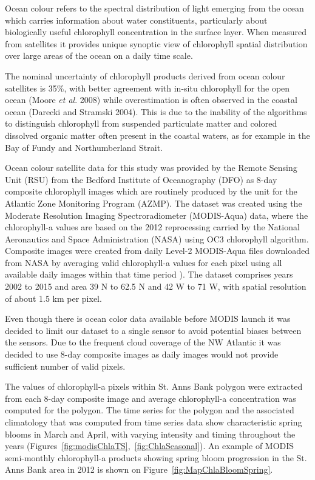 \documentclass[letterpaper,portrait,11pt]{scrartcl}
\numberwithin{equation}{section}		%
\numberwithin{figure}{section}		%
\numberwithin{table}{section}				%
\begin{document}
Ocean colour refers to the spectral distribution of light emerging from the ocean which carries information about water constituents, particularly about biologically useful chlorophyll concentration in the surface layer. When measured from satellites it provides unique synoptic view of chlorophyll spatial distribution over large areas of the ocean on a daily time scale.

The nominal uncertainty of chlorophyll products derived from ocean colour satellites is 35\%, with better agreement with in-situ chlorophyll for the open ocean (Moore \textit{et al}. 2008) while overestimation is often observed in the coastal ocean (Darecki and Stramski 2004). This is due to the inability of the algorithms to distinguish chlorophyll from suspended particulate matter and colored dissolved organic matter often present in the coastal waters, as for example in the Bay of Fundy and Northumberland Strait.

Ocean colour satellite data for this study was provided by the Remote Sensing Unit (RSU) from the Bedford Institute of Oceanography (DFO) as 8-day composite chlorophyll images which are routinely produced by the unit for the Atlantic Zone Monitoring Program (AZMP). The dataset was created using the Moderate Resolution Imaging Spectroradiometer (MODIS-Aqua) data, where the chlorophyll-a values are based on the 2012 reprocessing carried by the National Aeronautics and Space Administration (NASA) using OC3 chlorophyll algorithm. Composite images were created from daily Level-2 MODIS-Aqua files downloaded from NASA by averaging valid chlorophyll-a values for each pixel using all available daily images within that time period \parencite{Caverhill:2015:modis,feldman:2015}). The dataset comprises years 2002 to 2015 and area 39 N to 62.5 N and 42 W to 71 W, with spatial resolution of about 1.5 km per pixel. 

Even though there is ocean color data available before MODIS launch it was decided to limit our dataset to a single sensor to avoid potential biases between the sensors. Due to the frequent cloud coverage of the NW Atlantic it was decided to use 8-day composite images as daily images would not provide sufficient number of valid pixels. 

The values of chlorophyll-a pixels within St. Anns Bank polygon were extracted from each 8-day composite image and average chlorophyll-a concentration was computed for the polygon. The time series for the polygon and the associated climatology that was computed from time series data show characteristic spring blooms in March and April, with varying intensity and timing throughout the years (Figures~\ref{fig:modisChlaTS},~\ref{fig:ChlaSeasonal}). An example of MODIS semi-monthly chlorophyll-a products showing spring bloom progression in the St. Anns Bank area in 2012 is shown on Figure~\ref{fig:MapChlaBloomSpring}.
\end{document}
